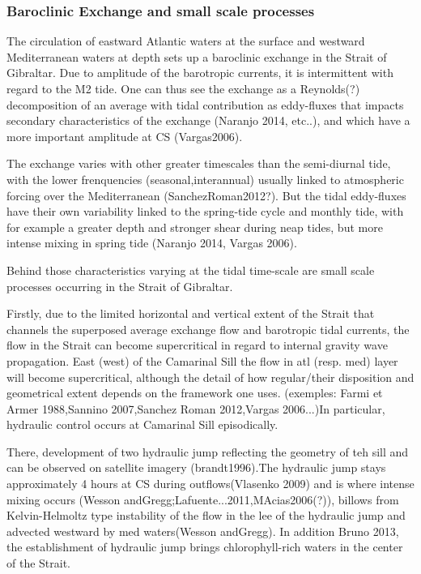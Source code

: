 \subsubsection{Baroclinic Exchange and small scale processes}


The circulation of eastward Atlantic waters at the surface and westward Mediterranean waters at depth sets up a baroclinic exchange in the Strait of Gibraltar. Due to amplitude of the barotropic currents, it is intermittent with regard to the M2 tide. One can thus see the exchange as a Reynolds(?) decomposition of an average with tidal contribution as eddy-fluxes that impacts secondary characteristics of the exchange (Naranjo 2014, etc..), and which have a more important amplitude at CS (Vargas2006).  

The exchange varies with other greater timescales than the semi-diurnal tide, with the lower frenquencies (seasonal,interannual) usually linked to atmospheric forcing over the Mediterranean (SanchezRoman2012?). But the tidal eddy-fluxes have their own variability linked to the spring-tide cycle and monthly tide, with for example a greater depth and stronger shear during neap tides, but more intense mixing in spring tide (Naranjo 2014, Vargas 2006).

Behind those characteristics varying at the tidal time-scale are small scale processes occurring in the Strait of Gibraltar.



Firstly, due to the limited horizontal and vertical extent of the Strait that channels the superposed average exchange flow and barotropic tidal currents, the flow in the Strait can become supercritical in regard to internal gravity wave propagation. East (west) of the Camarinal Sill the flow in atl (resp. med) layer will become supercritical, although the detail of how regular/their disposition and geometrical extent depends on the framework one uses. (exemples: Farmi et Armer 1988,Sannino 2007,Sanchez Roman 2012,Vargas 2006...)In particular, hydraulic control occurs at Camarinal Sill episodically.

There, development of two hydraulic jump reflecting the geometry of teh sill and can be observed on satellite imagery (brandt1996).The hydraulic jump stays approximately 4 hours at CS during outflows(Vlasenko 2009) and is where intense mixing occurs (Wesson andGregg;Lafuente...2011,MAcias2006(?)), billows from Kelvin-Helmoltz type instability of the flow in the lee of the hydraulic jump and advected westward by med waters(Wesson andGregg). In addition Bruno 2013, the establishment of hydraulic jump brings chlorophyll-rich waters in the center of the Strait.

